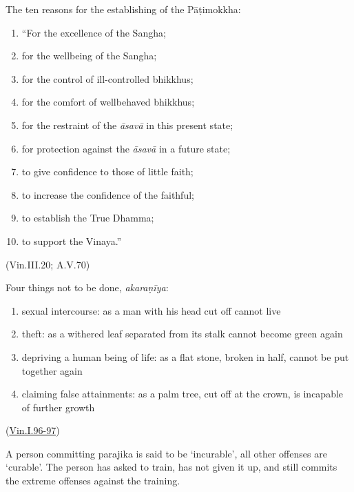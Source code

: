 \begin{multicols}{2}

The ten reasons for the establishing of the Pāṭimokkha:

\begin{enumerate}
\def\labelenumi{\arabic{enumi}.}
\tightlist
\item
  ``For the excellence of the Sangha;
\item
  for the wellbeing of the Sangha;
\item
  for the control of ill-controlled bhikkhus;
\item
  for the comfort of wellbehaved bhikkhus;
\item
  for the restraint of the \emph{āsavā} in this present state;
\item
  for protection against the \emph{āsavā} in a future state;
\item
  to give confidence to those of little faith;
\item
  to increase the confidence of the faithful;
\item
  to establish the True Dhamma;
\item
  to support the Vinaya.''
\end{enumerate}

(Vin.III.20; A.V.70)

\columnbreak

Four things not to be done, \emph{akaraṇīya}:

\begin{enumerate}
\def\labelenumi{\arabic{enumi}.}
\tightlist
\item
  sexual intercourse: as a man with his head cut off cannot live
\item
  theft: as a withered leaf separated from its stalk cannot become green
  again
\item
  depriving a human being of life: as a flat stone, broken in half,
  cannot be put together again
\item
  claiming false attainments: as a palm tree, cut off at the crown, is
  incapable of further growth
\end{enumerate}

(\href{https://suttacentral.net/pli-tv-kd1/en/horner-brahmali}{Vin.I.96-97})

A person committing parajika is said to be `incurable', all other
offenses are `curable'. The person has asked to train, has not given it
up, and still commits the extreme offenses against the training.

\end{multicols}
\par
\clearpage

